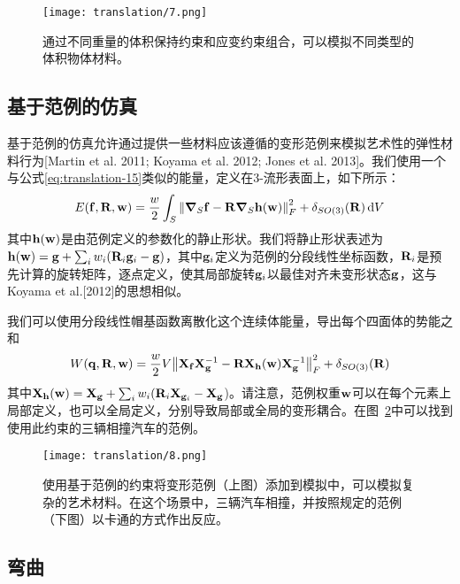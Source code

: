 \begin{translation}
\begin{figure}
  \centering
  \texttt{[image: translation/7.png]}
  \caption{
    通过不同重量的体积保持约束和应变约束组合，可以模拟不同类型的体积物体材料。
  }
  \label{fig:translation-7}
\end{figure}

\subsection{基于范例的仿真}

基于范例的仿真允许通过提供一些材料应该遵循的变形范例来模拟艺术性的弹性材料行为[Martin et al. 2011; Koyama et al. 2012; Jones et al. 2013]。我们使用一个与公式\eqref{eq:translation-15}类似的能量，定义在3-流形表面上，如下所示：
\begin{equation}
  E(\vb{f}, \vb{R}, \vb{w}) = \frac{w}{2} \int_S \norm{\grad_S{\vb{f}} - \vb{R} \grad_S{\vb{h}(\vb{w})}}_F^2 + \delta_{SO(3)}(\vb{R}) \dd{V}
  \label{eq:translation-17}
\end{equation}
其中$\vb{h}(\vb{w})$是由范例定义的参数化的静止形状。我们将静止形状表述为$\vb{h}(\vb{w}) = \vb{g} + \sum_i w_i(\vb{R}_i \vb{g}_i - \vb{g})$，其中$\vb{g}_i$定义为范例的分段线性坐标函数，$\vb{R}_i$是预先计算的旋转矩阵，逐点定义，使其局部旋转$\vb{g}_i$以最佳对齐未变形状态$\vb{g}$，这与Koyama et al.[2012]的思想相似。

我们可以使用分段线性帽基函数离散化这个连续体能量，导出每个四面体的势能之和
\begin{equation}
  W(\vb{q}, \vb{R}, \vb{w}) = \frac{w}{2} V \norm{\vb{X}_{\vb{f}} \vb{X}_{\vb{g}}^{-1} - \vb{R} \vb{X}_{\vb{h}}(\vb{w}) \vb{X}_{\vb{g}}^{-1}}_F^2 + \delta_{SO(3)}(\vb{R})
  \label{eq:translation-18}
\end{equation}
其中$\vb{X}_{\vb{h}}(\vb{w}) = \vb{X}_{\vb{g}} + \sum_i w_i(\vb{R}_i \vb{X}_{\vb{g}_i} - \vb{X}_{\vb{g}}$)。请注意，范例权重$\vb{w}$可以在每个元素上局部定义，也可以全局定义，分别导致局部或全局的变形耦合。在图~\ref{fig:translation-8}中可以找到使用此约束的三辆相撞汽车的范例。

\begin{figure}
  \centering
  \texttt{[image: translation/8.png]}
  \caption{
    使用基于范例的约束将变形范例（上图）添加到模拟中，可以模拟复杂的艺术材料。在这个场景中，三辆汽车相撞，并按照规定的范例（下图）以卡通的方式作出反应。
  }
  \label{fig:translation-8}
\end{figure}

\subsection{弯曲}


\end{translation}
